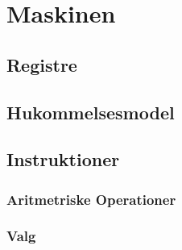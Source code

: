 \chapter{Maskinen}
\label{sec:machine}

\section{Registre}

\section{Hukommelsesmodel}

\section{Instruktioner}

\subsection{Aritmetriske Operationer}

\subsection{Valg}


